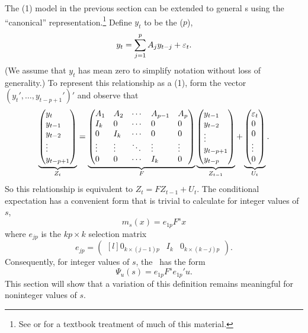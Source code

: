 \documentclass[12pt,fleqn]{article}
\begin{document}
The \AR(1) model in the previous section can be extended to general
\VAR s using the ``canonical'' representation.\footnote{%
  See \citet{Ham:94} or \citet{HaS:13} for a textbook treatment of
  much of this material.} %
Define $y_t$ to be the \VAR($p$),
\[
y_t = \sum_{j=1}^p A_j y_{t-j} + \varepsilon_t.
\]
(We assume that $y_t$ has mean zero to simplify notation without loss
of generality.) To represent this relationship as a \VAR(1), form the
vector $(y_t',\dots,y_{t-p+1}')'$ and observe that
\begin{equation}
\label{eq:7}
\underbrace{\begin{pmatrix*}[l]
  y_t \\ y_{t-1} \\ y_{t-2} \\ \vdots \\ y_{t-p+1}
\end{pmatrix*}}_{Z_t}
=
\underbrace{\begin{pmatrix*}[l]
  A_1 & A_2 & \cdots & A_{p-1} & A_p \\
  I_k & 0   & \cdots & 0 & 0 \\
  0  & I_k  & \cdots & 0 & 0 \\
  \vdots & \vdots & \ddots & \vdots & \vdots \\
  0 & 0 & \cdots & I_k & 0
\end{pmatrix*}}_{F}
\underbrace{\begin{pmatrix*}[l]
  y_{t-1} \\ y_{t-2} \\ \vdots \\ y_{t-p+1} \\ y_{t-p}
\end{pmatrix*}}_{Z_{t-1}}
+
\underbrace{\begin{pmatrix*}[l]
  \vep_{t} \\ 0 \\ 0 \\ \vdots \\ 0
\end{pmatrix*}}_{U_t}.
\end{equation}
So this relationship is equivalent to $Z_t = F Z_{t-1} + U_t$. The
conditional expectation has a convenient form that is trivial to
calculate for integer values of $s$,
\begin{equation*}
  m_s(x) = e_{1p} F^s x
\end{equation*}
where $e_{jp}$ is the $k p \times k$ selection matrix
\begin{equation*}
  e_{jp} = \begin{pmatrix*}[l]
    0_{k \times (j-1)p} & I_k & 0_{k \times (k - j)p}
  \end{pmatrix*}.
\end{equation*}
Consequently, for integer values of $s$, the \IRF\ has the form
\begin{equation*}
  \Psi_u(s) = e_{1p} F^s e_{1p}' u.
\end{equation*}
This section will show that a variation of
this definition remains meaningful for noninteger values of $s$.
\end{document}
